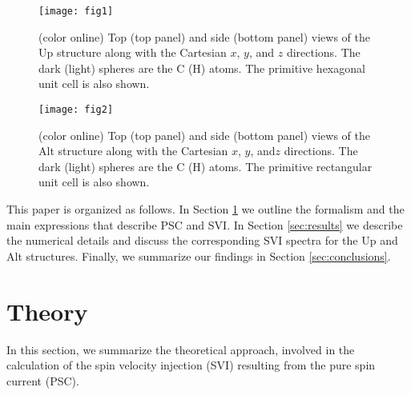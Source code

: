 \documentclass[floatfix,prb,aps,superscriptaddress,showpacs,11pt,preprint,letterpaper]{revtex4}
\begin{document}
\begin{figure}[ht!]
    \centering
    \texttt{[image: fig1]}
    \caption{(color online) Top (top panel) and side (bottom panel) views of
the Up structure along with the Cartesian $x$, $y$, and $z$ directions. The
dark (light) spheres are the C (H) atoms. The primitive hexagonal unit cell is
also shown.}
    \label{fig:up-struc}
\end{figure}
\begin{figure}[ht!]
    \centering
    \texttt{[image: fig2]}
    \caption{(color online) Top (top panel) and side (bottom panel) views of
the Alt structure along with the Cartesian $x$, $y$, and$ z$ directions. The
dark (light) spheres are the C (H) atoms. The primitive rectangular unit cell
is also shown. }
    \label{fig:alt-struc}
\end{figure}

This paper is organized as follows. In Section \ref{sec:theory} we outline the
formalism and the main expressions  that describe PSC and SVI. In Section
\ref{sec:results} we describe the numerical details  and  discuss the
corresponding SVI spectra for the Up and Alt structures. Finally, we summarize
our findings in Section \ref{sec:conclusions}.

\section{Theory}
\label{sec:theory}

In this section, we  summarize the theoretical approach, involved in the
calculation of the spin velocity injection (SVI) resulting from the pure spin
current (PSC).
 
\end{document}
